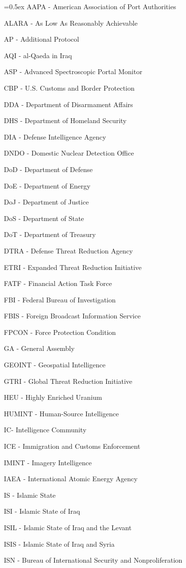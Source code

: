 \documentclass{report}
\begin{document}
{\parskip=0.5ex AAPA - American Association of Port Authorities

ALARA - As Low As Reasonably Achievable

AP - Additional Protocol

AQI -  al-Qaeda in Iraq

ASP - Advanced Spectroscopic Portal Monitor

CBP - U.S. Customs and Border Protection

DDA - Department of Disarmament Affairs

DHS - Department of Homeland Security

DIA - Defense Intelligence Agency

DNDO - Domestic Nuclear Detection Office

DoD - Department of Defense

DoE - Department of Energy

DoJ - Department of Justice

DoS - Department of State

DoT - Department of Treasury

DTRA - Defense Threat Reduction Agency

ETRI - Expanded Threat Reduction Initiative

FATF - Financial Action Task Force

FBI - Federal Bureau of Investigation

FBIS - Foreign Broadcast Information Service

FPCON - Force Protection Condition

GA - General Assembly

GEOINT - Geospatial Intelligence

GTRI - Global Threat Reduction Initiative

HEU - Highly Enriched Uranium

HUMINT - Human-Source Intelligence

IC- Intelligence Community

ICE - Immigration and Customs Enforcement

IMINT - Imagery Intelligence 

IAEA - International Atomic Energy Agency 

IS - Islamic State

ISI - Islamic State of Iraq

ISIL - Islamic State of Iraq and the Levant

ISIS - Islamic State of Iraq and Syria

ISN - Bureau of International Security and Nonproliferation

}
\end{document}
